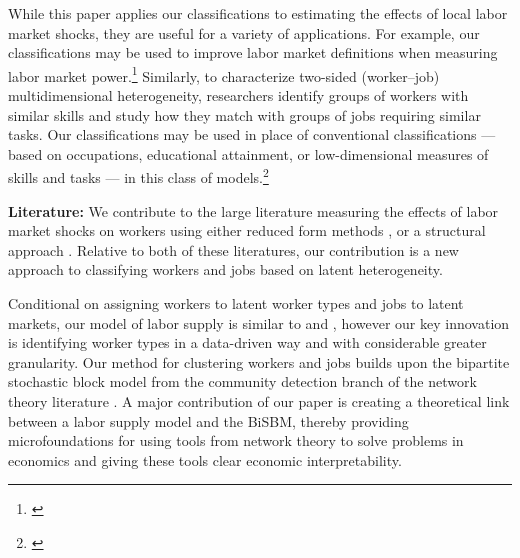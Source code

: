 \documentclass[12pt]{article}
\theoremstyle{definition}
\theoremstyle{plain}
\begin{document}
While this paper applies our classifications to estimating the effects of local labor market shocks, they are useful for a variety of applications. For example, our classifications may be used to improve labor market definitions when measuring labor market power.\footnote{\citet{BergerHerkenhoffMongey2022,Felix2021,AzarMarinescuSteinbaumTaska2018,BenmelechBergmanKim2018,Rinz2018,AzarMarinescuSteinbaum2019,SchubertStansburyTaska2020,Arnold2020,Lipsius2018,JaroschNimczikSorkin2019}} Similarly,  to characterize two-sided (worker--job) multidimensional heterogeneity, researchers identify groups of workers with similar skills and study how they match with groups of jobs requiring similar tasks. Our classifications may be used in place of conventional classifications --- based on occupations, educational attainment, or low-dimensional measures of skills and tasks --- in this class of models.\footnote{\citet{AutorLevyMurnane2003,AcemogluAutor2011,Autor2013,Tan2018,Lindenlaub2017,Kantenga2018}} 



\textbf{Literature:} We contribute to the large literature measuring the effects of labor market shocks on workers using either reduced form methods \citep{AutorDornHanson2013,Card1990,AutorDornHansonSong2014,Yagan2017,BoundHolzer2000,BlanchardKatz1992,Bartik1991}, or a structural approach \citep{BursteinMoralesVogel2019,CaliendoDvorkinParro2019,GalleRodriguezclareYi2017,KimVogel2021}. Relative to both of these literatures, our contribution is a new approach to classifying workers and jobs based on latent heterogeneity.

Conditional on assigning workers to latent worker types and jobs to latent markets, our model of labor supply is similar to \citet{Grigsby2019} and \citet{BonhommeLamadonManresa2019_distributional}, however our key innovation is identifying worker types in a data-driven way and with considerable greater granularity. Our method for clustering workers and jobs builds upon the bipartite stochastic block model from the community detection branch of the network theory literature \citep{LarremoreClausetJacobs2014,Peixoto2019}. A major contribution of our paper is creating a theoretical link between a labor supply model and the BiSBM, thereby providing microfoundations for using tools from network theory to solve problems in economics and giving these tools clear economic interpretability. 
\end{document}
